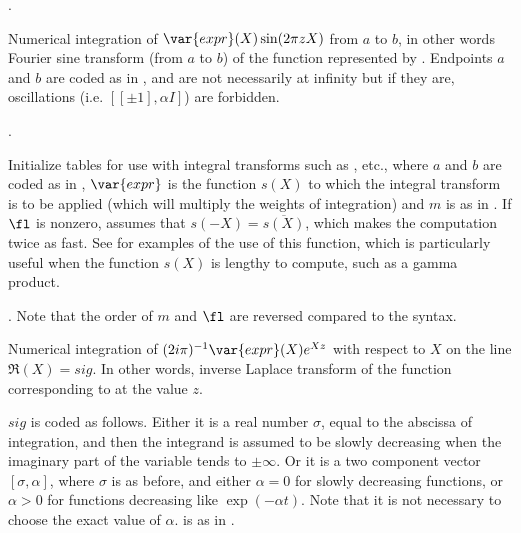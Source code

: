 .

\label{se:intfouriersin}
Numerical
integration of $\var{expr}(X)\sin(2\pi zX)$ from $a$ to $b$, in other words
Fourier sine transform (from $a$ to $b$) of the function represented by
. Endpoints $a$ and $b$ are coded as in , and are not
necessarily at infinity but if they are, oscillations (i.e. $[[\pm1],\alpha
I]$) are forbidden.

.

\label{se:intfuncinit}
Initialize tables for use with integral transforms such as ,
etc., where $a$ and $b$ are coded as in , $\var{expr}$ is the
function $s(X)$ to which the integral transform is to be applied (which will
multiply the weights of integration) and $m$ is as in . If
$\fl$ is nonzero, assumes that $s(-X)=\overline{s(X)}$, which makes the
computation twice as fast. See  for examples of the
use of this function, which is particularly useful when the function $s(X)$
is lengthy to compute, such as a gamma product.

. Note that the order of $m$ and $\fl$ are reversed compared
to the  syntax.

\label{se:intlaplaceinv}
Numerical integration of $(2i\pi)^{-1}\var{expr}(X)e^{Xz}$ with respect
to $X$ on the line $\Re(X)=sig$. In other words, inverse Laplace transform
of the function corresponding to  at the value $z$.

$sig$ is coded as follows. Either it is a real number $\sigma$, equal to the
abscissa of integration, and then the integrand is assumed to
be slowly decreasing when the imaginary part of the variable tends to
$\pm\infty$. Or it is a two component vector $[\sigma,\alpha]$, where
$\sigma$ is as before, and either $\alpha=0$ for slowly decreasing functions,
or $\alpha>0$ for functions decreasing like $\exp(-\alpha t)$. Note that it
is not necessary to choose the exact value of $\alpha$.  is as in
.

